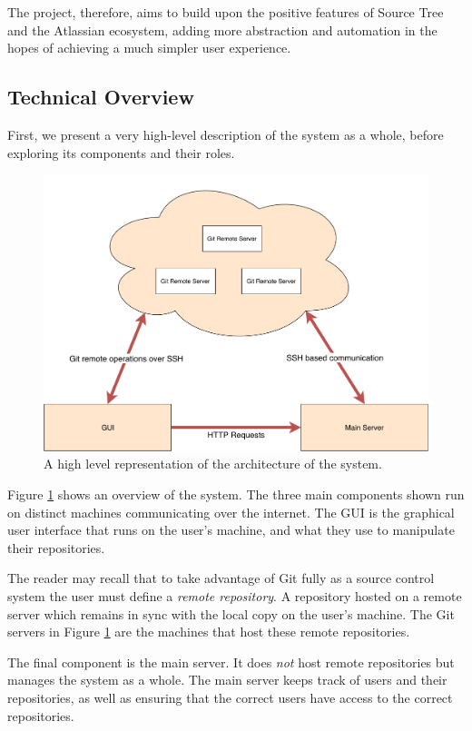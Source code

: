 The project, therefore, aims to build upon the positive features of Source Tree and the Atlassian ecosystem, adding more abstraction and automation in the hopes of achieving a much simpler user experience.

\subsection{Technical Overview}

First, we present a very high-level description of the system as a whole, before exploring its components and their roles.

\begin{figure} 
    \centering
    \includegraphics[scale = 0.5]{figures/highlevel.pdf}
    \caption{A high level representation of the architecture of the system. }
    \label{fig:highlevel}
\end{figure}

Figure \ref{fig:highlevel} shows an overview of the system. The three main components shown run on distinct machines communicating over the internet. The GUI is the graphical user interface that runs on the user's machine, and what they use to manipulate their repositories. 

The reader may recall that to take advantage of Git fully as a source control system the user must define a \emph{remote repository}. A repository hosted on a remote server which remains in sync with the local copy on the user's machine. The Git servers in Figure \ref{fig:highlevel} are the machines that host these remote repositories.

The final component is the main server. It does \emph{not} host remote repositories but manages the system as a whole. The main server keeps track of users and their repositories, as well as ensuring that the correct users have access to the correct repositories. 

